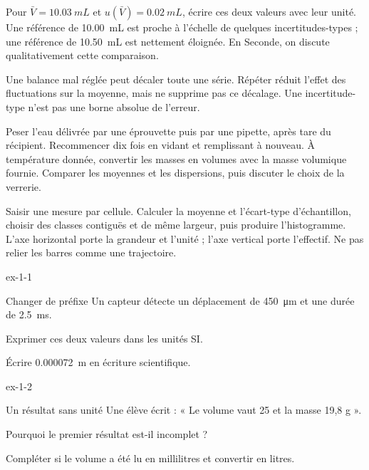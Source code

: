 \begin{exemple}Pour $\bar V=\qty{10,03}{mL}$ et $u(\bar V)=\qty{0,02}{mL}$, écrire ces deux valeurs avec leur unité. Une référence de \qty{10,00}{mL} est proche à l'échelle de quelques incertitudes-types ; une référence de \qty{10,50}{mL} est nettement éloignée. En Seconde, on discute qualitativement cette comparaison.\end{exemple}
\begin{attention}Une balance mal réglée peut décaler toute une série. Répéter réduit l'effet des fluctuations sur la moyenne, mais ne supprime pas ce décalage. Une incertitude-type n'est pas une borne absolue de l'erreur.\end{attention}
\begin{experience}Peser l'eau délivrée par une éprouvette puis par une pipette, après tare du récipient. Recommencer dix fois en vidant et remplissant à nouveau. À température donnée, convertir les masses en volumes avec la masse volumique fournie. Comparer les moyennes et les dispersions, puis discuter le choix de la verrerie.\end{experience}
\begin{savoirfaire}[Tableur]Saisir une mesure par cellule. Calculer la moyenne et l'écart-type d'échantillon, choisir des classes contiguës et de même largeur, puis produire l'histogramme. L'axe horizontal porte la grandeur et l'unité ; l'axe vertical porte l'effectif. Ne pas relier les barres comme une trajectoire.\end{savoirfaire}
\exercices
{}
\begin{blocLivre}{ex-1-1}\begin{exercice}[1]{Changer de préfixe}
Un capteur détecte un déplacement de \qty{450}{\micro m} et une durée de \qty{2,5}{ms}.
\begin{questions}
\item Exprimer ces deux valeurs dans les unités SI.
\item Écrire \qty{0,000072}{m} en écriture scientifique.
\end{questions}
\end{exercice}\end{blocLivre}
\begin{blocLivre}{ex-1-2}\begin{exercice}[1]{Un résultat sans unité}
Une élève écrit : « Le volume vaut 25 et la masse 19,8 g ».
\begin{questions}
\item Pourquoi le premier résultat est-il incomplet ?
\item Compléter si le volume a été lu en millilitres et convertir en litres.
\end{questions}
\end{exercice}\end{blocLivre}

